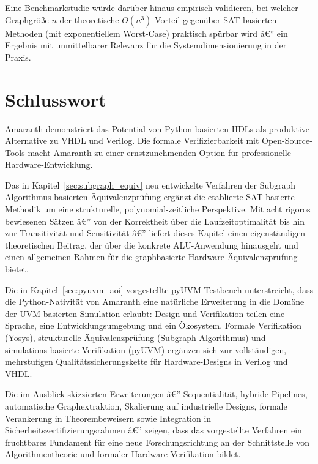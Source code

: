 ﻿\documentclass[12pt,a4paper]{report}
\begin{document}
Eine Benchmarkstudie würde darüber hinaus empirisch validieren, bei welcher Graphgröße
$n$ der theoretische $O(n^3)$-Vorteil gegenüber SAT-basierten Methoden (mit exponentiellem
Worst-Case) praktisch spürbar wird â€” ein Ergebnis mit unmittelbarer
Relevanz für die Systemdimensionierung in der Praxis.

\section{Schlusswort}

Amaranth demonstriert das Potential von Python-basierten HDLs als produktive Alternative
zu VHDL und Verilog. Die formale Verifizierbarkeit mit Open-Source-Tools macht Amaranth
zu einer ernstzunehmenden Option für professionelle Hardware-Entwicklung.

Das in Kapitel~\ref{sec:subgraph_equiv} neu entwickelte Verfahren der
Subgraph Algorithmus-basierten Äquivalenzprüfung ergänzt die etablierte SAT-basierte
Methodik um eine strukturelle, polynomial-zeitliche Perspektive. Mit acht rigoros
bewiesenen Sätzen â€” von der Korrektheit über die Laufzeitoptimalität bis hin zur
Transitivität und Sensitivität â€” liefert dieses Kapitel einen eigenständigen
theoretischen Beitrag, der über die konkrete ALU-Anwendung hinausgeht und einen
allgemeinen Rahmen für die graphbasierte Hardware-Äquivalenzprüfung bietet.

Die in Kapitel~\ref{sec:pyuvm_aoi} vorgestellte pyUVM-Testbench unterstreicht, dass
die Python-Nativität von Amaranth eine natürliche Erweiterung in die Domäne der
UVM-basierten Simulation erlaubt: Design und Verifikation teilen eine Sprache, eine
Entwicklungsumgebung und ein Ökosystem. Formale Verifikation (Yosys), strukturelle
Äquivalenzprüfung (Subgraph Algorithmus) und simulations-basierte Verifikation (pyUVM)
ergänzen sich zur vollständigen, mehrstufigen Qualitätssicherungskette für
Hardware-Designs in Verilog und VHDL.

Die im Ausblick skizzierten Erweiterungen â€” Sequentialität, hybride Pipelines,
automatische Graphextraktion, Skalierung auf industrielle Designs, formale Verankerung
in Theorembeweisern sowie Integration in Sicherheitszertifizierungsrahmen â€” zeigen,
dass das vorgestellte Verfahren ein fruchtbares Fundament für eine neue Forschungsrichtung
an der Schnittstelle von Algorithmentheorie und formaler Hardware-Verifikation bildet.
\end{document}
